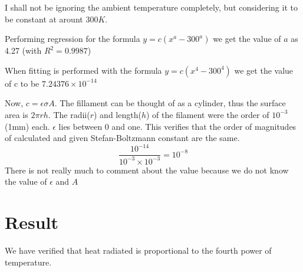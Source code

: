 \documentclass[12pt]{article}
\newlength\fwidth
\newlength\fheight
\begin{document}

I shall not be ignoring the ambient temperature completely, but considering it to be constant at arount $300K$.
\begin{figure}[!ht]
    \centering
    \setlength{}
    \setlength{}
    
\end{figure}

\noindent Performing regression for the formula
$y=c(x^a-300^a)$
we get the value of $a$ as 4.27 (with $R^2 = 0.9987$)

\begin{figure}[!ht]
    \centering
    \setlength{}
    \setlength{}
    
\end{figure}

When fitting is performed with the formula $y=c(x^4-300^4)$
we get the value of c to be $7.24376\times10^{-14}$

Now, $c = \epsilon \sigma A$.
The fillament can be thought of as a cylinder, thus the surface area is $2\pi r h$.
The radii($r$) and length($h$) of the filament were the order of $10^{-3}$(1mm) each.
$\epsilon$ lies between 0 and one.
This verifies that the order of magnitudes of calculated and given Stefan-Boltzmann constant are the same.
\[\frac{10^{-14}}{10^{-3}\times 10^{-3}} = 10^{-8}\]
There is not really much to comment about the value because we do not know the value of $\epsilon$ and $A$

\section*{Result}
We have verified that heat radiated is proportional to the fourth power of temperature.
\end{document}
